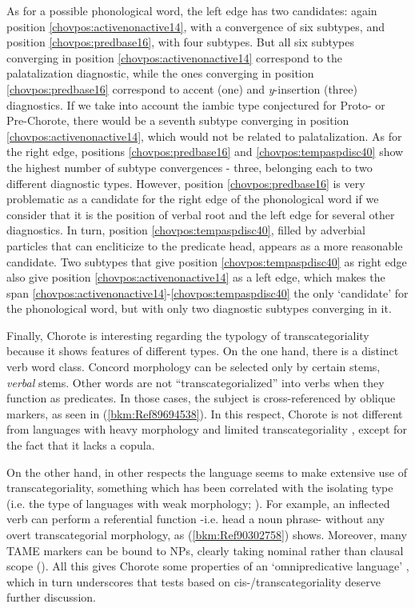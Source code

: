 \documentclass[output=paper]{langscibook}
\begin{document}
As for a possible phonological word, the left edge has two candidates: again position \ref{chovpos:activenonactive14}, with a convergence of six subtypes, and position \ref{chovpos:predbase16}, with four subtypes. But all six subtypes converging in position \ref{chovpos:activenonactive14} correspond to the palatalization diagnostic, while the ones converging in position \ref{chovpos:predbase16} correspond to accent (one) and \textit{y}{}-insertion (three) diagnostics. If we take into account the iambic type conjectured for Proto- or Pre-Chorote, there would be a seventh subtype converging in position \ref{chovpos:activenonactive14}, which would not be related to palatalization. As for the right edge, positions \ref{chovpos:predbase16} and \ref{chovpos:tempaspdisc40} show the highest number of subtype convergences - three, belonging each to two different diagnostic types. However, position \ref{chovpos:predbase16} is very problematic as a candidate for the right edge of the phonological word if we consider that it is the position of verbal root and the left edge for several other diagnostics. In turn, position \ref{chovpos:tempaspdisc40}, filled by adverbial particles that can encliticize to the predicate head, appears as a more reasonable candidate. Two subtypes that give position \ref{chovpos:tempaspdisc40} as right edge also give position \ref{chovpos:activenonactive14} as a left edge, which makes the span \ref{chovpos:activenonactive14}{}-\ref{chovpos:tempaspdisc40} the only `candidate' for the phonological word, but with only two diagnostic subtypes converging in it.

Finally, Chorote is interesting regarding the typology of transcategoriality because it shows features of different types. On the one hand, there is a distinct verb word class. Concord morphology can be selected only by certain stems, \textit{verbal} stems. Other words are not ``transcategorialized'' into verbs when they function as predicates. In those cases, the subject is cross{}-referenced by oblique markers, as seen in (\ref{bkm:Ref89694538}). In this respect, Chorote is not different from languages with heavy morphology and limited transcategoriality \citep{Robert2003}, except for the fact that it lacks a copula.

On the other hand, in other respects the language seems to make extensive use of transcategoriality, something which has been correlated with the isolating type (i.e. the type of languages with weak morphology; \citealt{Robert2003}). For example, an inflected verb can perform a referential function -i.e. head a noun phrase- without any overt transcategorial morphology, as (\ref{bkm:Ref90302758}) shows. Moreover, many TAME markers can be bound to NPs, clearly taking nominal rather than clausal scope (\citealt{Carol2014,Carol2015}). All this gives Chorote some properties of an `omnipredicative language' \citep{Launey1994}, which in turn underscores that tests based on cis-/transcategoriality deserve further discussion.


\printglossary

\sloppy\printbibliography[heading=subbibliography,notkeyword=this]
\end{document}
